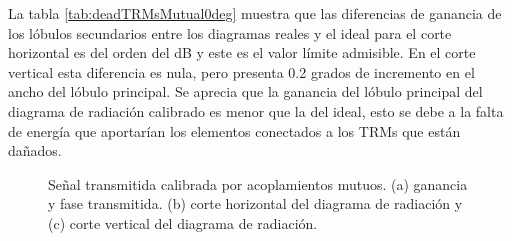 La tabla \ref{tab:deadTRMsMutual0deg} muestra que las diferencias de ganancia de los lóbulos secundarios entre los diagramas 
reales y el ideal para el corte horizontal es del orden del dB y este es el valor límite admisible. En el corte vertical esta 
diferencia es nula, pero presenta 0.2 grados de incremento en el ancho del lóbulo principal. Se aprecia que la ganancia del 
lóbulo principal del diagrama de radiación calibrado es menor que la del ideal, esto se debe a la falta de energía que 
aportarían los elementos conectados a los TRMs que están dañados.

\begin{figure}[H]
	\centering

	\caption{Señal transmitida calibrada por acoplamientos mutuos. (a) ganancia y fase transmitida. (b) corte horizontal del 
	diagrama de radiación y (c) corte vertical del diagrama de radiación.}
	\label{fig:deadTRMsMutual0deg}
\end{figure}
